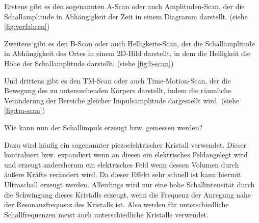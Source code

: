 Erstens gibt es den sogenannten A-Scan oder auch Amplituden-Scan, der die Schallamplitude in Abhängigkeit der Zeit in einem Diagramm darstellt. (siehe \autoref{fig:verfahren})

Zweitens gibt es den B-Scan oder auch Helligkeits-Scan, der die Schallamplitude in Abhängigkeit des Ortes in einem 2D-Bild darstellt, in dem die Helligkeit die Höhe der Schallamplitude darstellt. (siehe \autoref{fig:b-scan})

Und drittens gibt es den TM-Scan oder auch Time-Motion-Scan, der die Bewegung des zu untersuchenden Körpers darstellt, indem die räumliche Veränderung der Bereiche gleicher Impulsamplitude dargestellt wird. (siehe \autoref{fig:tm-scan})


Wie kann nun der Schallimpuls erzeugt bzw. gemessen werden?

Dazu wird häufig ein sogenannter piezoelektrischer Kristall verwendet.
Dieser kontrahiert bzw. expandiert wenn an diesen ein elektrisches Feldangelegt wird und erzeugt andersherum ein elektrisches Feld wenn dessen Volumen durch äußere Kräfte verändert wird.
Da dieser Effekt sehr schnell ist kann hiermit Ultraschall erzeugt werden.
Allerdings wird nur eine hohe Schallintensität durch die Schwingung dieses Kristalls erzeugt, wenn die Frequenz der Anregung nahe der Resonanzfrequenz des Kristalls ist.
Also werden für unterschiedliche Schallfrequenzen meist auch unterschiedliche Kristalle verwendet.

